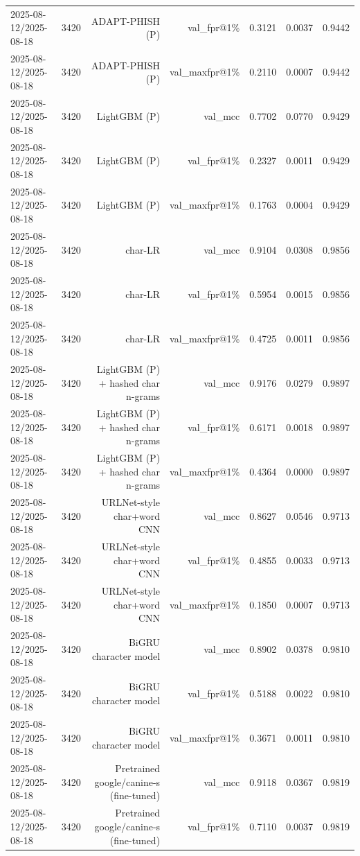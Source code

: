 \begin{table}[t]
\begin{tabular}{llrrrrr}
2025-08-12/2025-08-18 & 3420 & ADAPT-PHISH (P) & val\_fpr@1\% & 0.3121 & 0.0037 & 0.9442 \\
2025-08-12/2025-08-18 & 3420 & ADAPT-PHISH (P) & val\_maxfpr@1\% & 0.2110 & 0.0007 & 0.9442 \\
2025-08-12/2025-08-18 & 3420 & LightGBM (P) & val\_mcc & 0.7702 & 0.0770 & 0.9429 \\
2025-08-12/2025-08-18 & 3420 & LightGBM (P) & val\_fpr@1\% & 0.2327 & 0.0011 & 0.9429 \\
2025-08-12/2025-08-18 & 3420 & LightGBM (P) & val\_maxfpr@1\% & 0.1763 & 0.0004 & 0.9429 \\
2025-08-12/2025-08-18 & 3420 & char-LR & val\_mcc & 0.9104 & 0.0308 & 0.9856 \\
2025-08-12/2025-08-18 & 3420 & char-LR & val\_fpr@1\% & 0.5954 & 0.0015 & 0.9856 \\
2025-08-12/2025-08-18 & 3420 & char-LR & val\_maxfpr@1\% & 0.4725 & 0.0011 & 0.9856 \\
2025-08-12/2025-08-18 & 3420 & LightGBM (P) + hashed char n-grams & val\_mcc & 0.9176 & 0.0279 & 0.9897 \\
2025-08-12/2025-08-18 & 3420 & LightGBM (P) + hashed char n-grams & val\_fpr@1\% & 0.6171 & 0.0018 & 0.9897 \\
2025-08-12/2025-08-18 & 3420 & LightGBM (P) + hashed char n-grams & val\_maxfpr@1\% & 0.4364 & 0.0000 & 0.9897 \\
2025-08-12/2025-08-18 & 3420 & URLNet-style char+word CNN & val\_mcc & 0.8627 & 0.0546 & 0.9713 \\
2025-08-12/2025-08-18 & 3420 & URLNet-style char+word CNN & val\_fpr@1\% & 0.4855 & 0.0033 & 0.9713 \\
2025-08-12/2025-08-18 & 3420 & URLNet-style char+word CNN & val\_maxfpr@1\% & 0.1850 & 0.0007 & 0.9713 \\
2025-08-12/2025-08-18 & 3420 & BiGRU character model & val\_mcc & 0.8902 & 0.0378 & 0.9810 \\
2025-08-12/2025-08-18 & 3420 & BiGRU character model & val\_fpr@1\% & 0.5188 & 0.0022 & 0.9810 \\
2025-08-12/2025-08-18 & 3420 & BiGRU character model & val\_maxfpr@1\% & 0.3671 & 0.0011 & 0.9810 \\
2025-08-12/2025-08-18 & 3420 & Pretrained google/canine-s (fine-tuned) & val\_mcc & 0.9118 & 0.0367 & 0.9819 \\
2025-08-12/2025-08-18 & 3420 & Pretrained google/canine-s (fine-tuned) & val\_fpr@1\% & 0.7110 & 0.0037 & 0.9819 \\

\end{tabular}
\end{table}
